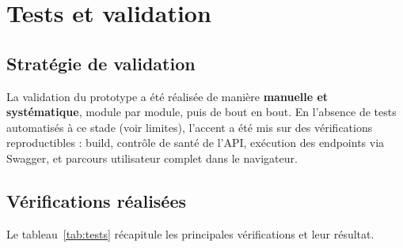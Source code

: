 \chapter{Tests et validation}

\section{Stratégie de validation}

La validation du prototype a été réalisée de manière \textbf{manuelle et
systématique}, module par module, puis de bout en bout. En l'absence de tests
automatisés à ce stade (voir limites), l'accent a été mis sur des vérifications
reproductibles : build, contrôle de santé de l'API, exécution des endpoints via
Swagger, et parcours utilisateur complet dans le navigateur.

\section{Vérifications réalisées}

Le tableau~\ref{tab:tests} récapitule les principales vérifications et leur
résultat.

